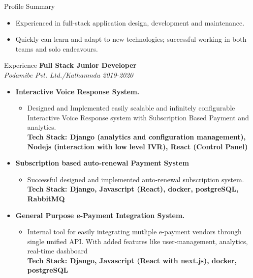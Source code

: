 \documentclass{resume} %
\begin{document}
\begin{rSection}{Profile Summary}
\begin{itemize}
    \item  Experienced in full-stack application design, development and maintenance.
    \item  Quickly can learn and adapt to new technologies; successful working in both teams and solo endeavours.
\end{itemize}
\end{rSection}

\begin{rSection}{Experience}
\large{{\bf Full Stack Junior Developer}}
\\ \small{\textit{Podamibe Pvt. Ltd./Kathamndu 2019-2020}}
\begin{itemize}
    \item \textbf{Interactive Voice Response System.}
        \begin{itemize}
            \item Designed and Implemented easily scalable and infinitely configurable Interactive Voice Response system
            with Subscription Based Payment and analytics.
            \\ \footnotesize{\textbf{Tech Stack: Django (analytics and configuration management), Nodejs (interaction with low level IVR), React (Control Panel)}}
        \end{itemize}

    \item \textbf{Subscription based auto-renewal Payment System}
        \begin{itemize}
            \item Successful designed and implemented auto-renewal subscription system.
            \\ \footnotesize{\textbf{Tech Stack: Django, Javascript (React), docker, postgreSQL, RabbitMQ}}
        \end{itemize}

    \item \textbf{General Purpose e-Payment Integration System.}
        \begin{itemize}
            \item Internal tool for easily integrating mutliple e-payment vendors through single unified API. With added features like user-management, analytics, real-time dashboard
            \\ \footnotesize{\textbf{Tech Stack: Django, Javascript (React with next.js), docker, postgreSQL}}
        \end{itemize}


\end{itemize}
\end{rSection}
\end{document}
